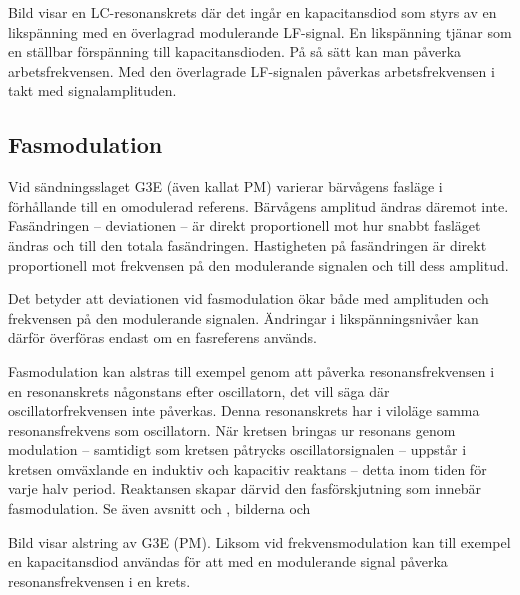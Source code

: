 
Bild  visar en LC-resonanskrets där det ingår en
kapacitansdiod som styrs av en likspänning med en överlagrad modulerande LF-signal.
En likspänning tjänar som en ställbar förspänning till kapacitansdioden.
På så sätt kan man påverka arbetsfrekvensen.
Med den överlagrade LF-signalen påverkas arbetsfrekvensen i takt med
signalamplituden.

\subsection{Fasmodulation}

Vid sändningsslaget G3E (även kallat PM) varierar bärvågens fasläge i
förhållande till en omodulerad referens.
Bärvågens amplitud ändras däremot inte.
Fasändringen -- deviationen -- är direkt proportionell mot hur snabbt fasläget
ändras och till den totala fasändringen.
Hastigheten på fasändringen är direkt proportionell mot frekvensen på den
modulerande signalen och till dess amplitud.

Det betyder att deviationen vid fasmodulation ökar både med amplituden
och frekvensen på den modulerande signalen.
Ändringar i likspänningsnivåer kan därför överföras endast om en fasreferens
används.

Fasmodulation kan alstras till exempel genom att påverka resonansfrekvensen i
en resonanskrets någonstans efter oscillatorn, det vill säga där
oscillatorfrekvensen inte påverkas.
Denna resonanskrets har i viloläge samma resonansfrekvens som oscillatorn.
När kretsen bringas ur resonans genom modulation -- samtidigt som kretsen
påtrycks oscillatorsignalen -- uppstår i kretsen omväxlande en induktiv och
kapacitiv reaktans -- detta inom tiden för varje halv period.
Reaktansen skapar därvid den fasförskjutning som innebär fasmodulation.
Se även avsnitt  och , bilderna
 och 


Bild  visar alstring av G3E (PM).
Liksom vid frekvensmodulation kan till exempel en kapacitansdiod användas för att
med en modulerande signal påverka resonansfrekvensen i en krets.

